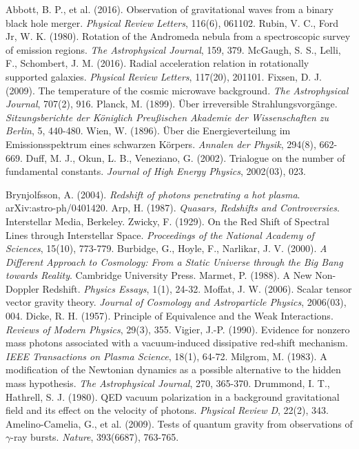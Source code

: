 \documentclass[12pt,a4paper]{article}
\begin{document}
\begin{thebibliography}{99}
		 Abbott, B. P., et al. (2016). Observation of gravitational waves from a binary black hole merger. \textit{Physical Review Letters}, 116(6), 061102.
		 Rubin, V. C., Ford Jr, W. K. (1980). Rotation of the Andromeda nebula from a spectroscopic survey of emission regions. \textit{The Astrophysical Journal}, 159, 379.
		 McGaugh, S. S., Lelli, F., Schombert, J. M. (2016). Radial acceleration relation in rotationally supported galaxies. \textit{Physical Review Letters}, 117(20), 201101.
		 Fixsen, D. J. (2009). The temperature of the cosmic microwave background. \textit{The Astrophysical Journal}, 707(2), 916.
		 Planck, M. (1899). Über irreversible Strahlungsvorgänge. \textit{Sitzungsberichte der Königlich Preußischen Akademie der Wissenschaften zu Berlin}, 5, 440-480.
		 Wien, W. (1896). Über die Energieverteilung im Emissionsspektrum eines schwarzen Körpers. \textit{Annalen der Physik}, 294(8), 662-669.
		 Duff, M. J., Okun, L. B., Veneziano, G. (2002). Trialogue on the number of fundamental constants. \textit{Journal of High Energy Physics}, 2002(03), 023.
		
		 Brynjolfsson, A. (2004). \textit{Redshift of photons penetrating a hot plasma}. arXiv:astro-ph/0401420.
		 Arp, H. (1987). \textit{Quasars, Redshifts and Controversies}. Interstellar Media, Berkeley.
		 Zwicky, F. (1929). On the Red Shift of Spectral Lines through Interstellar Space. \textit{Proceedings of the National Academy of Sciences}, 15(10), 773-779.
		 Burbidge, G., Hoyle, F., Narlikar, J. V. (2000). \textit{A Different Approach to Cosmology: From a Static Universe through the Big Bang towards Reality}. Cambridge University Press.
		 Marmet, P. (1988). A New Non-Doppler Redshift. \textit{Physics Essays}, 1(1), 24-32.
		 Moffat, J. W. (2006). Scalar tensor vector gravity theory. \textit{Journal of Cosmology and Astroparticle Physics}, 2006(03), 004.
		 Dicke, R. H. (1957). Principle of Equivalence and the Weak Interactions. \textit{Reviews of Modern Physics}, 29(3), 355.
		 Vigier, J.-P. (1990). Evidence for nonzero mass photons associated with a vacuum-induced dissipative red-shift mechanism. \textit{IEEE Transactions on Plasma Science}, 18(1), 64-72.
		 Milgrom, M. (1983). A modification of the Newtonian dynamics as a possible alternative to the hidden mass hypothesis. \textit{The Astrophysical Journal}, 270, 365-370.
		 Drummond, I. T., Hathrell, S. J. (1980). QED vacuum polarization in a background gravitational field and its effect on the velocity of photons. \textit{Physical Review D}, 22(2), 343.
 Amelino-Camelia, G., et al. (2009). Tests of quantum gravity from observations of $\gamma$-ray bursts. \textit{Nature}, 393(6687), 763-765.
	\end{thebibliography}
	
\end{document}
